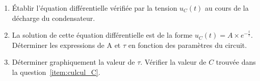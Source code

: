 \begin{enumerate}
    \item Établir l'équation différentielle vérifiée par la tension $u_{C}(t)$
          au cours de la décharge du condensateur.
    \item La solution de cette équation différentielle est de la forme
          $u_{C}(t)=A\times e^{-\frac{t}{\tau}}$. Déterminer les expressions de
          A et $\tau$ en fonction des paramètres du circuit.
    \item Déterminer graphiquement la valeur de $\tau$. Vérifier la valeur de
          $C$ trouvée dans la question~\ref{item:culcul_C}.
\end{enumerate}

